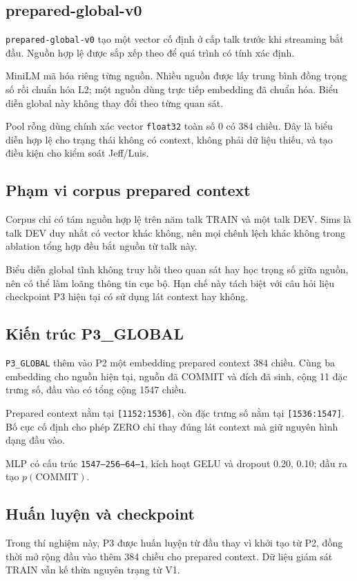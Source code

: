 \documentclass[11pt,a4paper]{article}
\numberwithin{figure}{section}
\numberwithin{table}{section}
\begin{document}
\subsection{prepared-global-v0}
\texttt{prepared-global-v0} tạo một vector cố định ở cấp talk trước khi streaming bắt đầu. Nguồn hợp lệ được sắp xếp theo  để quá trình có tính xác định.

MiniLM mã hóa riêng từng nguồn. Nhiều nguồn được lấy trung bình đồng trọng số rồi chuẩn hóa L2; một nguồn dùng trực tiếp embedding đã chuẩn hóa. Biểu diễn global này không thay đổi theo từng quan sát.

Pool rỗng dùng chính xác vector \texttt{float32} toàn số 0 có 384 chiều. Đây là biểu diễn hợp lệ cho trạng thái không có context, không phải dữ liệu thiếu, và tạo điều kiện cho kiểm soát Jeff/Luis.

\subsection{Phạm vi corpus prepared context}
Corpus chỉ có tám nguồn hợp lệ trên năm talk TRAIN và một talk DEV. Sims là talk DEV duy nhất có vector khác không, nên mọi chênh lệch khác không trong ablation tổng hợp đều bắt nguồn từ talk này.

Biểu diễn global tĩnh không truy hồi theo quan sát hay học trọng số giữa nguồn, nên có thể làm loãng thông tin cục bộ. Hạn chế này tách biệt với câu hỏi liệu checkpoint P3 hiện tại có sử dụng lát context hay không.

\subsection{Kiến trúc P3\_GLOBAL}
\texttt{P3\_GLOBAL} thêm vào P2 một embedding prepared context 384 chiều. Cùng ba embedding cho nguồn hiện tại, nguồn đã COMMIT và đích đã sinh, cộng 11 đặc trưng số, đầu vào có tổng cộng 1547 chiều.

Prepared context nằm tại \texttt{[1152:1536]}, còn đặc trưng số nằm tại \texttt{[1536:1547]}. Bố cục cố định cho phép ZERO chỉ thay đúng lát context mà giữ nguyên hình dạng đầu vào.

MLP có cấu trúc \texttt{1547--256--64--1}, kích hoạt GELU và dropout 0.20, 0.10; đầu ra tạo $p(\mathrm{COMMIT})$.

\subsection{Huấn luyện và checkpoint}
Trong thí nghiệm này, P3 được huấn luyện từ đầu thay vì khởi tạo từ P2, đồng thời mở rộng đầu vào thêm 384 chiều cho prepared context. Dữ liệu giám sát TRAIN vẫn kế thừa nguyên trạng từ V1.
\end{document}
